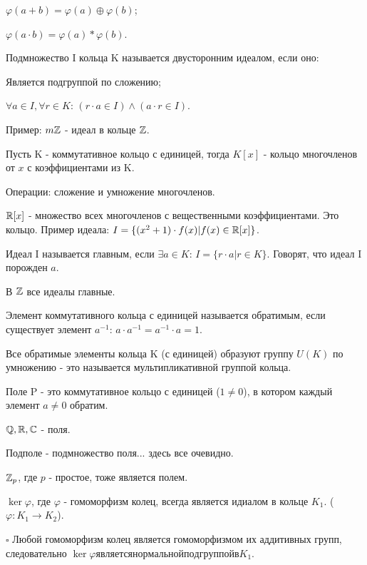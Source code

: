 \documentclass[../main.tex]{subfiles}
\begin{document}
     $\varphi(a + b) = \varphi(a) \oplus \varphi(b)$;

     $\varphi(a\cdot b) = \varphi(a) * \varphi(b)$.

    \void{} Подмножество I кольца K называется двусторонним идеалом, если оно:

     Является подгруппой по сложению;

     $\forall a\in I, \forall r\in K$: $(r\cdot a\in I) \wedge (a\cdot r\in I)$.

    Пример: $m\mathbb{Z}$ - идеал в кольце $\mathbb{Z}$.

    \void{} Пусть K - коммутативное кольцо с единицей, тогда $K[x]$ - кольцо
    многочленов от $x$ с коэффициентами из K.

    Операции: сложение и умножение многочленов.

    \void{} $\mathbb{R}[x]$ - множество всех многочленов с вещественными коэффициентами.
    Это кольцо. Пример идеала: $I = \{ (x^2+1)\cdot f(x) \vert f(x)\in \mathbb{R}[x] \}$.

    \void{} Идеал I называется главным, если $\exists a\in K$:
    $I = \{r\cdot a \vert r\in K\}$. Говорят, что идеал I порожден $a$.

    \void{} В $\mathbb{Z}$ все идеалы главные.
    
    \void{} Элемент коммутативного кольца с единицей называется обратимым, если
    существует элемент $a^{-1}$: $a\cdot a^{-1} = a^{-1}\cdot a = 1$.

    \void{} Все обратимые элементы кольца K (с единицей) образуют
    группу $U(K)$ по умножению - это называется мультипликативной группой кольца.

    \void{} Поле P - это коммутативное кольцо с единицей ($1\neq 0$), в котором
    каждый элемент $a\neq 0$ обратим.

    \void{} $\mathbb{Q} ,\mathbb{R}, \mathbb{C}$ - поля.

    \void{} Подполе - подмножество поля... здесь все очевидно.

    \void{} $\mathbb{Z}_p$, где $p$ - простое, тоже является полем.

    \void{} $\ker{\varphi}$, где $\varphi$ - гомоморфизм колец, всегда является
    идиалом в кольце $K_1$. ($\varphi: K_1\rightarrow K_2$).

    \void
    $\square$ Любой гомоморфизм колец является гомоморфизмом их аддитивных групп, следовательно
    $\ker{\varphi} является нормальной подгруппой в K_1$.
\end{document}
